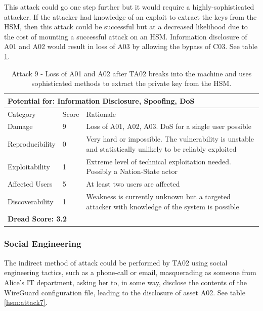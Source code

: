\documentclass [11pt, proquest] {uwthesis}[2020/02/24]
\begin{document}
This attack could go one step further but it would require a highly-sophisticated attacker. If the attacker had knowledge of an exploit to extract the keys from the HSM, then this attack could be successful but at a decreased likelihood due to the cost of mounting a successful attack on an HSM. Information disclosure of A01 and A02 would result in loss of A03 by allowing the bypass of C03. 
See table \ref{hsm:attack9}.
\begin{table}[H]
\begin{tabular}{|m{3cm}|m{.9cm}|p{27em} |}
\multicolumn{3}{l}{Potential for: Information Disclosure, Spoofing, DoS}                   \\
\hline
Category & Score & Rationale \\
\hline
Damage          & 9     & Loss of A01, A02, A03. DoS for a single user possible            \\
\hline
Reproducibility & 0     & Very hard or impossible. The vulnerability is unstable and statistically unlikely to be reliably exploited   \\
\hline
Exploitability & 1      & Extreme level of technical exploitation needed. Possibly a Nation-State actor   \\
\hline
Affected Users  & 5     & At least two users are affected                      \\
\hline
Discoverability & 1     & Weakness is currently unknown but a targeted attacker with knowledge of the system is possible   \\
\hline
\multicolumn{3}{l}{\textbf{Dread Score: 3.2}} 
\end{tabular}
\caption{Attack 9 - Loss of A01 and A02 after TA02 breaks into the machine and uses sophisticated methods to extract the private key from the HSM.}
\label{hsm:attack9}
\end{table}

\subsubsection{Social Engineering}
The indirect method of attack could be performed by TA02 using social engineering tactics, such as a phone-call or email, masquerading as someone from Alice's IT department, asking her to, in some way, disclose the contents of the WireGuard configuration file, leading to the disclosure of asset A02.
See table \ref{hsm:attack7}.
\end{document}
